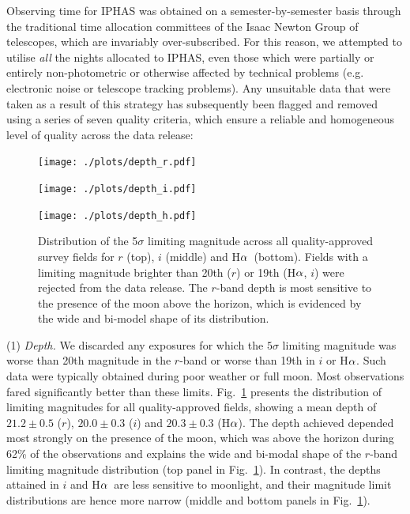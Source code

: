 \documentclass[useAMS,usenatbib]{mn2e}
\def\ha{\mbox{H$\rm \alpha$}}
\begin{document}
Observing time for IPHAS was obtained
on a semester-by-semester basis
through the traditional time allocation committees 
of the Isaac Newton Group of telescopes,
which are invariably over-subscribed.
For this reason, we attempted to utilise 
\emph{all} the nights allocated to IPHAS,
even those which were partially or entirely non-photometric
or otherwise affected by technical problems 
(e.g. electronic noise or telescope tracking problems).
Any unsuitable data that were taken as a result
of this strategy has subsequently been flagged and removed
using a series of seven quality criteria,
which ensure a reliable and homogeneous level of quality
across the data release:

\begin{figure}
    \begin{minipage}[b]{\linewidth}
        \texttt{[image: ./plots/depth\_r.pdf]} 
    \end{minipage}
    \begin{minipage}[b]{\linewidth}
        \texttt{[image: ./plots/depth\_i.pdf]} 
    \end{minipage}
    \begin{minipage}[b]{\linewidth}
        \texttt{[image: ./plots/depth\_h.pdf]} 
    \end{minipage}
    \caption{Distribution of the 5$\sigma$ limiting magnitude
             across all quality-approved survey fields
             for $r$ (top), $i$ (middle) and \ha\ (bottom).
             Fields with a limiting magnitude brighter than
             20th ($r$) or 19th (\ha, $i$) were rejected
             from the data release.
             The $r$-band depth is most sensitive 
             to the presence of the moon above the horizon, 
             which is evidenced by the wide and bi-model shape
             of its distribution.}
    \label{fig:depth}
\end{figure}

(1) \emph{Depth.} 
We discarded any exposures for which the $5\sigma$ limiting magnitude 
was worse than 20th magnitude in the $r$-band
or worse than 19th in $i$ or \ha. 
Such data were typically obtained during poor weather or full moon.
Most observations fared significantly better than these limits.
Fig.~\ref{fig:depth} presents the distribution of limiting magnitudes
for all quality-approved fields,
showing a mean depth of 
$21.2\pm0.5$ ($r$), $20.0\pm0.3$ ($i$) and $20.3\pm0.3$ (\ha).
The depth achieved depended 
most strongly on the presence of the moon,
which was above the horizon during 62\% 
of the observations and explains the wide and bi-modal shape
of the $r$-band limiting magnitude distribution 
(top panel in Fig.~\ref{fig:depth}).
In contrast, the depths attained in $i$ and \ha\ 
are less sensitive to moonlight,
and their magnitude limit distributions
are hence more narrow
(middle and bottom panels in Fig.~\ref{fig:depth}).
\end{document}
